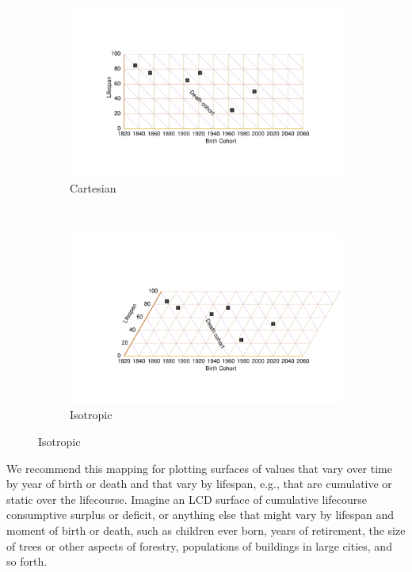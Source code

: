 \documentclass[12pt,oneside,a4paper]{article} %
\begin{document}
\begin{figure} 
\caption{An LCD diagram in two projections.}
\label{fig:LCD}
\centering
\begin{subfigure}{1.1\textwidth}
\caption{Cartesian}
\vspace{-5em}
\label{fig:LCDrt}
\includegraphics[scale=0.8]{Figures/LCDrt.pdf}
\end{subfigure}
\\\vspace{-2em}
\begin{subfigure}{1.1\textwidth}
\caption{Isotropic}
\vspace{-6em}
\label{fig:LCDeq}
\includegraphics[scale=0.8]{Figures/LCDeq.pdf}
\end{subfigure}
\end{figure} 

We
recommend this mapping for plotting surfaces of values that vary over time by year of birth or death and that vary by lifespan, e.g., that are cumulative or
static over the lifecourse. Imagine an LCD surface of cumulative lifecourse
consumptive surplus or deficit, or anything else that might vary by lifespan and
moment of birth or death, such as children ever born, years of retirement, the
size of trees or other aspects of forestry, populations of buildings in large
cities, and so forth. 
\end{document}
